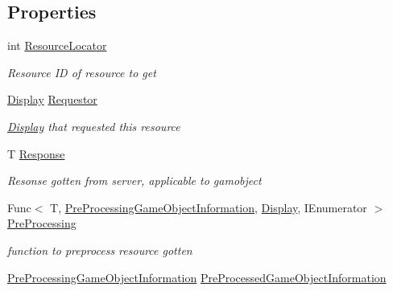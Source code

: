 \subsection*{Properties}
\begin{DoxyCompactItemize}
\item 
int \mbox{\hyperlink{class_display_resource_request_af7db29f1689fbcdd4bc5a9dd40675cf1}{Resource\+Locator}}
\begin{DoxyCompactList}\small\item\em Resource ID of resource to get \end{DoxyCompactList}\item 
\mbox{\hyperlink{class_display}{Display}} \mbox{\hyperlink{class_display_resource_request_a45c1024a90ddda1f8837daa50796458c}{Requestor}}
\begin{DoxyCompactList}\small\item\em \mbox{\hyperlink{class_display}{Display}} that requested this resource \end{DoxyCompactList}\item 
T \mbox{\hyperlink{class_display_resource_request_a95743229fd3f58ceed7090f9fd5e2fd5}{Response}}
\begin{DoxyCompactList}\small\item\em Resonse gotten from server, applicable to gamobject \end{DoxyCompactList}\item 
Func$<$ T, \mbox{\hyperlink{class_pre_processing_game_object_information}{Pre\+Processing\+Game\+Object\+Information}}, \mbox{\hyperlink{class_display}{Display}}, I\+Enumerator $>$ \mbox{\hyperlink{class_display_resource_request_a46343aa637c011c702f7b734e52fbe0b}{Pre\+Processing}}
\begin{DoxyCompactList}\small\item\em function to preprocess resource gotten \end{DoxyCompactList}\item 
\mbox{\hyperlink{class_pre_processing_game_object_information}{Pre\+Processing\+Game\+Object\+Information}} \mbox{\hyperlink{class_display_resource_request_ae237edf32250ad6e9a417d6c24224537}{Pre\+Processed\+Game\+Object\+Information}}

\end{DoxyCompactItemize}
